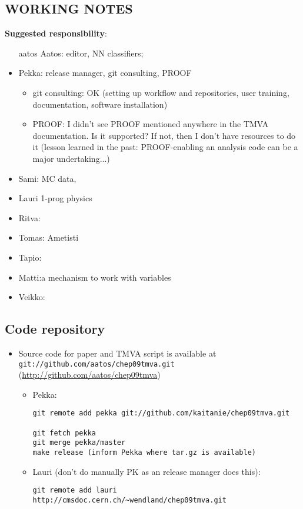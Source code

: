 \begin{appendix}
\section{WORKING NOTES}
{\bf Suggested  responsibility}: 
\begin{itemize}
\item[aatos]
Aatos: editor, NN classifiers; 
\item Pekka: release manager, git consulting, PROOF
\begin{itemize}
\item git consulting: OK (setting up workflow and repositories, user
  training, documentation, software installation)
\item PROOF: I didn't see PROOF mentioned anywhere in the TMVA
  documentation. Is it supported? If not, then I don't have resources
  to do it (lesson learned in the past: PROOF-enabling an analysis
  code can be a major undertaking...)
\end{itemize}
\item Sami: MC data, 
\item Lauri 1-prog physics
\item Ritva: 
\item Tomas: Ametisti
\item Tapio: 
\item Matti:a mechanism to work with variables 
\item Veikko:
\end{itemize}

\subsection{Code repository}


\begin{itemize}
\item Source code for paper and TMVA script  is available at 
{\tt git://github.com/aatos/chep09tmva.git} (\url{http://github.com/aatos/chep09tmva})

\begin{itemize}
\item Pekka:
\begin{verbatim}
git remote add pekka git://github.com/kaitanie/chep09tmva.git

git fetch pekka
git merge pekka/master
make release (inform Pekka where tar.gz is available)
\end{verbatim}

\item Lauri (don't do manually PK as an release manager does this):
\begin{verbatim}
git remote add lauri http://cmsdoc.cern.ch/~wendland/chep09tmva.git


\end{verbatim}
\end{itemize}
\end{itemize}
\end{appendix}
